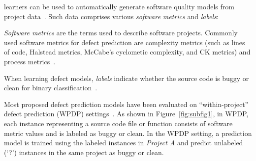 
 learners can be used to automatically generate software quality
models from project data~\cite{DAmbros12,Menzies07}.
Such data comprises  various {\em software metrics} and {\em labels}:
\squishlist
\item
{\em Software metrics} are the terms used to describe software projects. Commonly
used software metrics for defect prediction are complexity metrics (such as lines of code, Halstead
metrics, McCabe's cyclometic complexity, and CK metrics) and
process metrics~\cite{Basili96,Halstead77,McCabe76,Rahman13}.
\item
When learning defect models,
{\em labels} indicate
whether the source code is buggy or clean for binary
classification~\cite{Lee11,Nam13}.
\squishend

\noindent
Most proposed defect prediction models have been evaluated on
``within-project'' defect prediction (WPDP)
settings~\cite{DAmbros12,Lee11,Menzies07}.
As shown
in Figure~\ref{fig:subfig1}, in WPDP,  each instance representing a source code file or
function consists of software metric values and is labeled as buggy or clean.
In the WPDP setting, a prediction model is
trained using the labeled instances in {\em Project A} and predict unlabeled (`?')
instances in the same project as buggy or clean.

